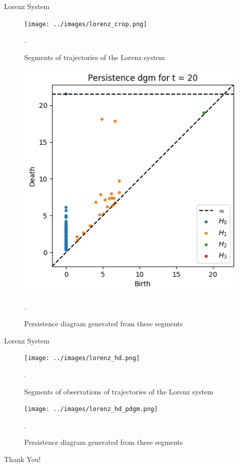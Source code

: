 \documentclass{beamer}
\begin{document}
\begin{frame}{Lorenz System}
        \begin{minipage}[b]{0.5\linewidth}
            \begin{figure}
            \texttt{[image: ../images/lorenz\_crop.png]}
            \caption{Segments of trajectories of the Lorenz system}.
            \end{figure}
        \end{minipage}
        \hspace{0.5cm}
        \pause
        \begin{minipage}[b]{0.4\linewidth}
            \begin{figure}
            \includegraphics[width=\textwidth]{../images/lorenz_pdgm.png}
            \caption{Persistence diagram generated from these segments}.
            \end{figure}
        \end{minipage}
\end{frame}
\begin{frame}{Lorenz System}
        \begin{minipage}[b]{0.5\linewidth}
            \begin{figure}
            \texttt{[image: ../images/lorenz\_hd.png]}
            \caption{Segments of observations of trajectories of the Lorenz system}.
            \end{figure}
        \end{minipage}
        \hspace{0.5cm}
        \pause
        \begin{minipage}[b]{0.4\linewidth}
            \begin{figure}
            \texttt{[image: ../images/lorenz\_hd\_pdgm.png]}
            \caption{Persistence diagram generated from these segments}.
            \end{figure}
        \end{minipage}
\end{frame}

\begin{frame}{}
    \begin{center}
\Huge Thank You!
\end{center}

\end{frame}
\end{document}
